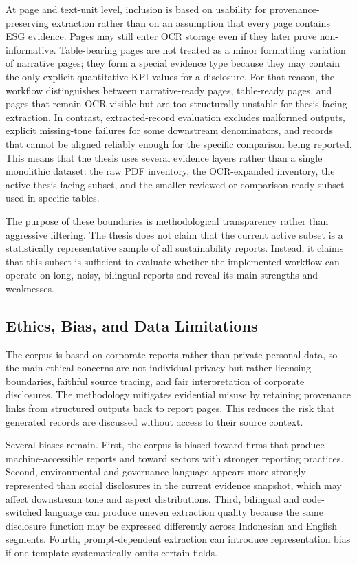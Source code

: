 \documentclass[english, online, cse, master]{dithesis}
\begin{document}
At page and text-unit level, inclusion is based on usability for provenance-preserving extraction rather than on an assumption that every page contains ESG evidence. Pages may still enter OCR storage even if they later prove non-informative. Table-bearing pages are not treated as a minor formatting variation of narrative pages; they form a special evidence type because they may contain the only explicit quantitative KPI values for a disclosure. For that reason, the workflow distinguishes between narrative-ready pages, table-ready pages, and pages that remain OCR-visible but are too structurally unstable for thesis-facing extraction. In contrast, extracted-record evaluation excludes malformed outputs, explicit missing-tone failures for some downstream denominators, and records that cannot be aligned reliably enough for the specific comparison being reported. This means that the thesis uses several evidence layers rather than a single monolithic dataset: the raw PDF inventory, the OCR-expanded inventory, the active thesis-facing subset, and the smaller reviewed or comparison-ready subset used in specific tables.

The purpose of these boundaries is methodological transparency rather than aggressive filtering. The thesis does not claim that the current active subset is a statistically representative sample of all sustainability reports. Instead, it claims that this subset is sufficient to evaluate whether the implemented workflow can operate on long, noisy, bilingual reports and reveal its main strengths and weaknesses.

\subsection{Ethics, Bias, and Data Limitations}

The corpus is based on corporate reports rather than private personal data, so the main ethical concerns are not individual privacy but rather licensing boundaries, faithful source tracing, and fair interpretation of corporate disclosures. The methodology mitigates evidential misuse by retaining provenance links from structured outputs back to report pages. This reduces the risk that generated records are discussed without access to their source context.

Several biases remain. First, the corpus is biased toward firms that produce machine-accessible reports and toward sectors with stronger reporting practices. Second, environmental and governance language appears more strongly represented than social disclosures in the current evidence snapshot, which may affect downstream tone and aspect distributions. Third, bilingual and code-switched language can produce uneven extraction quality because the same disclosure function may be expressed differently across Indonesian and English segments. Fourth, prompt-dependent extraction can introduce representation bias if one template systematically omits certain fields.
\end{document}
